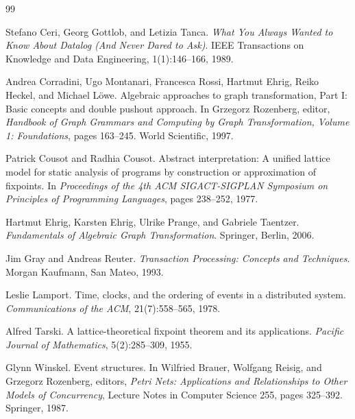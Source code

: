 \documentclass[11pt,a4paper]{article}
\theoremstyle{remark}
\begin{document}
\begin{thebibliography}{99}

Stefano Ceri, Georg Gottlob, and Letizia Tanca.
\newblock \emph{What You Always Wanted to Know About Datalog (And Never Dared to Ask)}.
\newblock IEEE Transactions on Knowledge and Data Engineering, 1(1):146--166, 1989.

Andrea Corradini, Ugo Montanari, Francesca Rossi, Hartmut Ehrig, Reiko Heckel, and Michael L\"owe.
\newblock Algebraic approaches to graph transformation, Part I: Basic concepts and double pushout approach.
\newblock In Grzegorz Rozenberg, editor, \emph{Handbook of Graph Grammars and Computing by Graph Transformation, Volume 1: Foundations}, pages 163--245. World Scientific, 1997.

Patrick Cousot and Radhia Cousot.
\newblock Abstract interpretation: A unified lattice model for static analysis of programs by construction or approximation of fixpoints.
\newblock In \emph{Proceedings of the 4th ACM SIGACT-SIGPLAN Symposium on Principles of Programming Languages}, pages 238--252, 1977.

Hartmut Ehrig, Karsten Ehrig, Ulrike Prange, and Gabriele Taentzer.
\newblock \emph{Fundamentals of Algebraic Graph Transformation}.
\newblock Springer, Berlin, 2006.

Jim Gray and Andreas Reuter.
\newblock \emph{Transaction Processing: Concepts and Techniques}.
\newblock Morgan Kaufmann, San Mateo, 1993.

Leslie Lamport.
\newblock Time, clocks, and the ordering of events in a distributed system.
\newblock \emph{Communications of the ACM}, 21(7):558--565, 1978.

Alfred Tarski.
\newblock A lattice-theoretical fixpoint theorem and its applications.
\newblock \emph{Pacific Journal of Mathematics}, 5(2):285--309, 1955.

Glynn Winskel.
\newblock Event structures.
\newblock In Wilfried Brauer, Wolfgang Reisig, and Grzegorz Rozenberg, editors,
\newblock \emph{Petri Nets: Applications and Relationships to Other Models of Concurrency},
\newblock Lecture Notes in Computer Science 255, pages 325--392. Springer, 1987.

\end{thebibliography}
\end{document}
